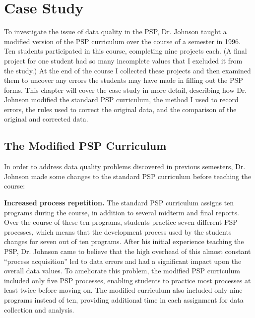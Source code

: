 \chapter{Case Study}

To investigate the issue of data quality in the PSP, Dr. Johnson taught a
modified version of the PSP curriculum over the course of a semester in
1996.  Ten students participated in this course, completing nine projects
each. (A final project for one student had so many incomplete values that I
excluded it from the study.) At the end of the course I collected these
projects and then examined them to uncover any errors the students may have
made in filling out the PSP forms.  This chapter will cover the case study
in more detail, describing how Dr. Johnson modified the standard PSP
curriculum, the method I used to record errors, the rules used to correct
the original data, and the comparison of the original and corrected data.


\section{\label{section:ModifiedPSP}The Modified PSP Curriculum}

In order to address data quality problems discovered in previous semesters,
Dr. Johnson made some changes to the standard PSP curriculum before
teaching the course:

{\bf Increased process repetition.} The standard PSP curriculum assigns ten
programs during the course, in addition to several midterm and final
reports.  Over the course of these ten programs, students practice seven
different PSP processes, which means that the development process used by
the students changes for seven out of ten programs.  After his initial
experience teaching the PSP, Dr. Johnson came to believe that the high
overhead of this almost constant ``process acquisition'' led to data errors
and had a significant impact upon the overall data values.  To ameliorate
this problem, the modified PSP curriculum included only five PSP processes,
enabling students to practice most processes at least twice before moving
on.  The modified curriculum also included only nine programs instead of
ten, providing additional time in each assignment for data collection and
analysis.

